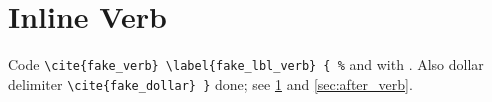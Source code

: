 \documentclass{article}
\begin{document}
\section{Inline Verb}\label{sec:verb_plain}
Code \verb+\cite{fake_verb} \label{fake_lbl_verb} { %+ and \cite{k1} with \label{sec:after_verb}.
Also dollar delimiter \verb$\cite{fake_dollar} }$ done; see \ref{sec:verb_plain} and \ref{sec:after_verb}.


\end{document}
